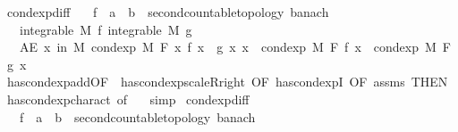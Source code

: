 \begin{isabellebody}
\ cond{\isacharunderscore}{\kern0pt}exp{\isacharunderscore}{\kern0pt}diff{\isacharcolon}{\kern0pt}\isanewline
\ \ \ f\ {\isacharcolon}{\kern0pt}{\isacharcolon}{\kern0pt}\ {\isachardoublequoteopen}{\isacharprime}{\kern0pt}a\ {\isasymRightarrow}\ {\isacharprime}{\kern0pt}b\ {\isacharcolon}{\kern0pt}{\isacharcolon}{\kern0pt}\ {\isacharbraceleft}{\kern0pt}second{\isacharunderscore}{\kern0pt}countable{\isacharunderscore}{\kern0pt}topology{\isacharcomma}{\kern0pt}\ banach{\isacharbraceright}{\kern0pt}{\isachardoublequoteclose}\isanewline
\ \ \ {\isachardoublequoteopen}integrable\ M\ f{\isachardoublequoteclose}\ {\isachardoublequoteopen}integrable\ M\ g{\isachardoublequoteclose}\isanewline
\ \ \ {\isachardoublequoteopen}AE\ x\ in\ M{\isachardot}{\kern0pt}\ cond{\isacharunderscore}{\kern0pt}exp\ M\ F\ {\isacharparenleft}{\kern0pt}{\isasymlambda}x{\isachardot}{\kern0pt}\ f\ x\ {\isacharminus}{\kern0pt}\ g\ x{\isacharparenright}{\kern0pt}\ x\ {\isacharequal}{\kern0pt}\ cond{\isacharunderscore}{\kern0pt}exp\ M\ F\ f\ x\ {\isacharminus}{\kern0pt}\ cond{\isacharunderscore}{\kern0pt}exp\ M\ F\ g\ x{\isachardoublequoteclose}\isanewline
%
\isadelimproof
\ \ %
\endisadelimproof
%
\isatagproof
{}\isamarkupfalse%
\ has{\isacharunderscore}{\kern0pt}cond{\isacharunderscore}{\kern0pt}exp{\isacharunderscore}{\kern0pt}add{\isacharbrackleft}{\kern0pt}OF\ {\isacharunderscore}{\kern0pt}\ has{\isacharunderscore}{\kern0pt}cond{\isacharunderscore}{\kern0pt}exp{\isacharunderscore}{\kern0pt}scaleR{\isacharunderscore}{\kern0pt}right{\isacharcomma}{\kern0pt}\ OF\ has{\isacharunderscore}{\kern0pt}cond{\isacharunderscore}{\kern0pt}expI{\isacharparenleft}{\kern0pt}{}{\isacharcomma}{\kern0pt}{}{\isacharparenright}{\kern0pt}{\isacharcomma}{\kern0pt}\ OF\ assms{\isacharcomma}{\kern0pt}\ THEN\ has{\isacharunderscore}{\kern0pt}cond{\isacharunderscore}{\kern0pt}exp{\isacharunderscore}{\kern0pt}charact{\isacharparenleft}{\kern0pt}{}{\isacharparenright}{\kern0pt}{\isacharcomma}{\kern0pt}\ of\ {\isachardoublequoteopen}{\isacharminus}{\kern0pt}{}{\isachardoublequoteclose}{\isacharbrackright}{\kern0pt}\ \isamarkupfalse%
\ simp%
\endisatagproof
{\isafoldproof}%
%
\isadelimproof
\isanewline
%
\endisadelimproof
\isanewline
{}\isamarkupfalse%
\ cond{\isacharunderscore}{\kern0pt}exp{\isacharunderscore}{\kern0pt}diff{\isacharprime}{\kern0pt}{\isacharcolon}{\kern0pt}\isanewline
\ \ \ f\ {\isacharcolon}{\kern0pt}{\isacharcolon}{\kern0pt}\ {\isachardoublequoteopen}{\isacharprime}{\kern0pt}a\ {\isasymRightarrow}\ {\isacharprime}{\kern0pt}b\ {\isacharcolon}{\kern0pt}{\isacharcolon}{\kern0pt}\ {\isacharbraceleft}{\kern0pt}second{\isacharunderscore}{\kern0pt}countable{\isacharunderscore}{\kern0pt}topology{\isacharcomma}{\kern0pt}\ banach{\isacharbraceright}{\kern0pt}{\isachardoublequoteclose}\isanewline

\end{isabellebody}
